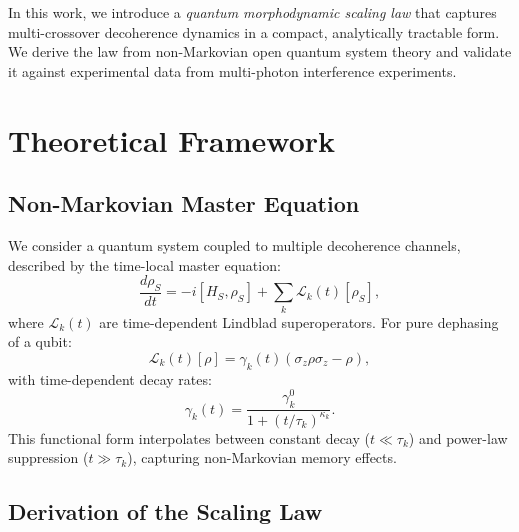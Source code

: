 \documentclass[12pt,a4paper]{article}
\begin{document}
In this work, we introduce a \textit{quantum morphodynamic scaling law} that captures multi-crossover decoherence dynamics in a compact, analytically tractable form. We derive the law from non-Markovian open quantum system theory and validate it against experimental data from multi-photon interference experiments.

\section{Theoretical Framework}

\subsection{Non-Markovian Master Equation}

We consider a quantum system coupled to multiple decoherence channels, described by the time-local master equation:
\begin{equation}
\frac{d\rho_S}{dt} = -i[H_S, \rho_S] + \sum_k \mathcal{L}_k(t)[\rho_S],
\end{equation}
where $\mathcal{L}_k(t)$ are time-dependent Lindblad superoperators. For pure dephasing of a qubit:
\begin{equation}
\mathcal{L}_k(t)[\rho] = \gamma_k(t) \left(\sigma_z \rho \sigma_z - \rho\right),
\end{equation}
with time-dependent decay rates:
\begin{equation}
\gamma_k(t) = \frac{\gamma_k^0}{1 + (t/\tau_k)^{\kappa_k}}.
\end{equation}
This functional form interpolates between constant decay ($t \ll \tau_k$) and power-law suppression ($t \gg \tau_k$), capturing non-Markovian memory effects.

\subsection{Derivation of the Scaling Law}
\end{document}

